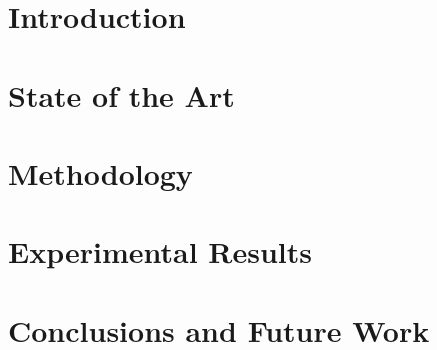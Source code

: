 \documentclass[12pt,a4paper]{article}
\begin{document}
\hypersetup{pageanchor=false}

\clearpage
\hypersetup{pageanchor=true}
\renewcommand{\totalpaginas}{\pageref*{LastRomanPage}}






\label{LastRomanPage}

\clearpage
{}
\renewcommand{\totalpaginas}{\pageref*{LastPage}}

\section{Introduction}
\label{sec:introduccion}


\section{State of the Art}
\label{sec:estado-arte}


\section{Methodology}
\label{sec:metodologia}





\section{Experimental Results}
\label{sec:resultados}



\section{Conclusions and Future Work}
\label{sec:conclusiones}


\clearpage
\renewcommand{\refname}{References}

{}


\label{anejo:comandos}


\label{anejo:codigo}


\label{anejo:telemetria}

\end{document}
